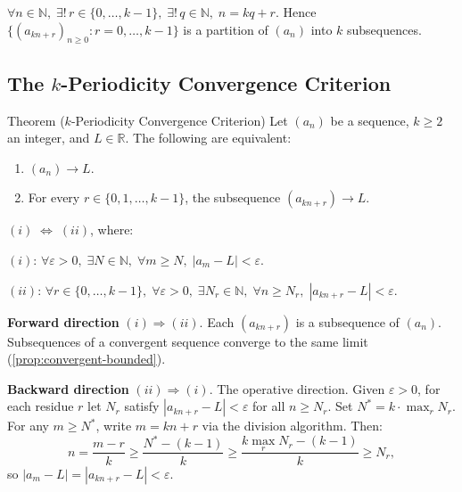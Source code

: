 \begin{remark}
$\forall n \in \mathbb{N},\;\exists!\, r \in \{0,\ldots,k-1\},\;\exists!\, q
\in \mathbb{N},\;n = kq + r$. Hence $\{(a_{kn+r})_{n\geq 0} :
r = 0,\ldots,k-1\}$ is a partition of $(a_n)$ into $k$ subsequences.
\end{remark}



\subsection*{The $k$-Periodicity Convergence Criterion}
\label{subsec:k-periodicity}

\begin{theorembox}{Theorem ($k$-Periodicity Convergence Criterion)}
\label{thm:k-periodicity}
Let $(a_n)$ be a sequence, $k \geq 2$ an integer, and $L \in \mathbb{R}$.
The following are equivalent:
\begin{enumerate}[label=(\roman*)]
  \item $(a_n) \to L$.
  \item For every $r \in \{0, 1, \ldots, k-1\}$, the subsequence
        $(a_{kn+r}) \to L$.
\end{enumerate}
\end{theorembox}

\begin{remark}
$(i) \;\Leftrightarrow\; (ii)$, where:

$(i)$: $\forall \varepsilon > 0,\;\exists N \in \mathbb{N},\;\forall m \geq N,\;
|a_m - L| < \varepsilon$.

$(ii)$: $\forall r \in \{0,\ldots,k-1\},\;\forall \varepsilon > 0,\;
\exists N_r \in \mathbb{N},\;\forall n \geq N_r,\;|a_{kn+r} - L| < \varepsilon$.
\end{remark}

\begin{remark}
\noindent\textbf{Forward direction} $(i) \Rightarrow (ii)$.
Each $(a_{kn+r})$ is a subsequence of $(a_n)$. Subsequences of a convergent
sequence converge to the same limit (\cref{prop:convergent-bounded}).

\medskip
\noindent\textbf{Backward direction} $(ii) \Rightarrow (i)$.
The operative direction. Given $\varepsilon > 0$, for each residue $r$ let
$N_r$ satisfy $|a_{kn+r} - L| < \varepsilon$ for all $n \geq N_r$. Set
$N^* = k \cdot \max_{r} N_r$. For any $m \geq N^*$, write $m = kn + r$
via the division algorithm. Then:
\[
  n = \frac{m - r}{k} \geq \frac{N^* - (k-1)}{k}
    \geq \frac{k \max_r N_r - (k-1)}{k} \geq N_r,
\]
so $|a_m - L| = |a_{kn+r} - L| < \varepsilon$.
\end{remark}

